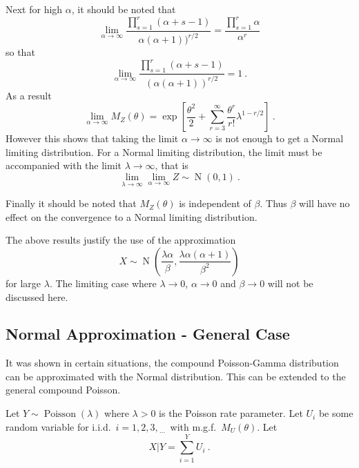 \documentclass[12pt, a4paper]{memoir}
\DeclareMathOperator{\normal}{N}
\DeclareMathOperator{\poisson}{Poisson}
\newcommand{\dotdotdot}{_{\phantom{.}\cdots}}
\begin{document}
Next for high $\alpha$, it should be noted that
\begin{equation*}
	\lim_{\alpha\rightarrow\infty}
	\frac{
		\prod_{s=1}^r(\alpha+s-1)
	}
	{
		\alpha(\alpha+1))^{r/2}
	}
	=
	\frac{
		\prod_{s=1}^r\alpha
	}
	{
		\alpha^{r}
	}
\end{equation*}
so that
\begin{equation}
	\lim_{\alpha\rightarrow\infty}
	\frac{
		\prod_{s=1}^r(\alpha+s-1)
	}
	{
		(\alpha(\alpha+1))^{r/2}
	}
	= 1
	\ .
\end{equation}
As a result
\begin{equation}
	\lim_{\alpha\rightarrow\infty}
	M_Z(\theta)=
	\exp\left[
		\frac{\theta^2}{2}
		+\sum_{r=3}^\infty
		\frac{\theta^r}{r!}
		\lambda^{1-r/2}
	\right]
	\ .
\end{equation}
However this shows that taking the limit $\alpha\rightarrow\infty$ is not enough to get a Normal limiting distribution. For a Normal limiting distribution, the limit must be accompanied with the limit $\lambda\rightarrow\infty$, that is
\begin{equation}
	\lim_{\lambda\rightarrow\infty}\lim_{\alpha\rightarrow\infty}Z\sim\normal(0,1)
	\ .
\end{equation}

Finally it should be noted that $M_Z(\theta)$ is independent of $\beta$. Thus $\beta$ will have no effect on the convergence to a Normal limiting distribution.

The above results justify the use of the approximation
\begin{equation}
	X\sim\normal\left(\frac{\lambda\alpha}{\beta},\frac{\lambda\alpha(\alpha+1)}{\beta^2}\right)
\end{equation}
for large $\lambda$. The limiting case where $\lambda\rightarrow 0$, $\alpha\rightarrow 0$ and $\beta\rightarrow 0$ will not be discussed here.

\subsection{Normal Approximation - General Case}
It was shown in certain situations, the compound Poisson-Gamma distribution can be approximated with the Normal distribution. This can be extended to the general compound Poisson.

Let $Y\sim\poisson(\lambda)$ where $\lambda>0$ is the Poisson rate parameter. Let $U_i$ be some random variable for i.i.d.~$i=1,2,3,\dotdotdot$ with m.g.f.~$M_U(\theta)$. Let
\begin{equation}
	X|Y = \sum_{i=1}^{Y}U_i
	\ .
\end{equation}
\end{document}
